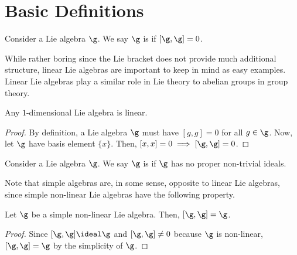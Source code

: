 \documentclass[11pt,leqno,oneside]{amsart}
\numberwithin{thm}{section}
\begin{document}
\section{Basic Definitions}
\begin{defn}
  Consider a Lie algebra \(\g\). We say \(\g\) is  if
  \([\g,\g] = 0\).
\end{defn}
While rather boring since the Lie bracket does not provide much
additional structure, linear Lie algebras are important to keep in
mind as easy examples. Linear Lie algebras play a similar role in Lie
theory to abelian groups in group theory.
\begin{thm}
  Any \(1\)-dimensional Lie algebra is linear.
\end{thm}
\begin{proof}
  By definition, a Lie algebra \(\g\) must have \([g,g] = 0\) for all
  \(g \in \g\). Now, let \(\g\) have basis element \(\{x\}\). Then,
  \([x,x] = 0 \implies [\g,\g] = 0\).
\end{proof}
\begin{defn}
  Consider a Lie algebra \(\g\). We say \(\g\) is  if
  \(\g\) has no proper non-trivial ideals.
\end{defn}
Note that simple algebras are, in some sense, opposite to linear Lie
algebras, since simple non-linear Lie algebras have the following
property.
\begin{prop}
  Let \(\g\) be a simple non-linear Lie algebra. Then, \([\g,\g] =
  \g\). 
\end{prop}
\begin{proof}
  Since \([\g,\g] \ideal \g\) and \([\g,\g] \neq 0\) because \(\g\) is
  non-linear, \([\g,\g] = \g\) by the simplicity of \(\g\). 
\end{proof}
\end{document}
